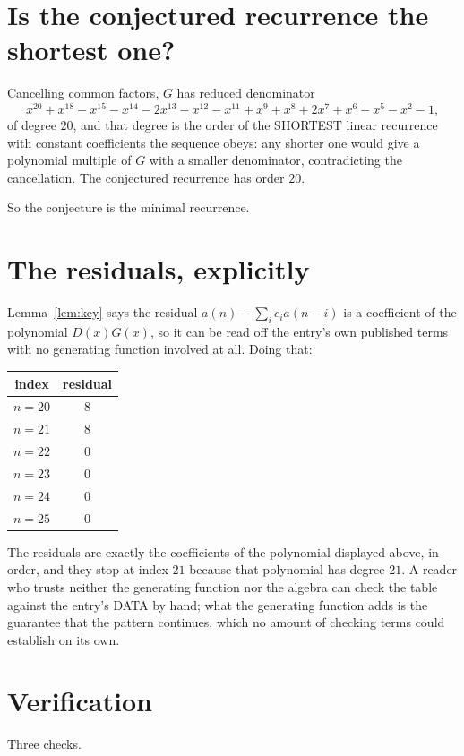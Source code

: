 \documentclass[11pt,a4paper]{article}
\theoremstyle{plain}
\theoremstyle{definition}
\begin{document}
\section{Is the conjectured recurrence the shortest one?}

Cancelling common factors, $G$ has reduced denominator
\[
x^{20} + x^{18} - x^{15} - x^{14} - 2 x^{13} - x^{12} - x^{11} + x^{9} + x^{8} + 2 x^{7} + x^{6} + x^{5} - x^{2} - 1,
\]
of degree $20$, and that degree is the order of the SHORTEST linear recurrence with
constant coefficients the sequence obeys: any shorter one would give a polynomial multiple of
$G$ with a smaller denominator, contradicting the cancellation. The conjectured recurrence has
order $20$.

So the conjecture is the minimal recurrence.

\section{The residuals, explicitly}

Lemma~\ref{lem:key} says the residual $a(n)-\sum_ic_ia(n-i)$ is a coefficient of the
polynomial $D(x)G(x)$, so it can be read off the entry's own published terms with no
generating function involved at all. Doing that:
\begin{center}
\begin{tabular}{cc}
index & residual \\ \hline
$n=20$ & $8$ \\
$n=21$ & $8$ \\
$n=22$ & $0$ \\
$n=23$ & $0$ \\
$n=24$ & $0$ \\
$n=25$ & $0$
\end{tabular}
\end{center}
The residuals are exactly the coefficients of the polynomial displayed above, in order, and
they stop at index $21$ because that polynomial has degree $21$. A reader who trusts
neither the generating function nor the algebra can check the table against the entry's DATA
by hand; what the generating function adds is the guarantee that the pattern continues, which
no amount of checking terms could establish on its own.

\section{Verification}

Three checks.
\end{document}
